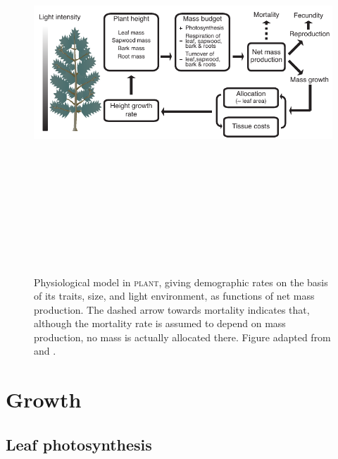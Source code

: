 \documentclass[10pt,twoside]{article}
\newcommand{\plant}{\textsc{plant}}
\begin{document}
\begin{figure}[h!]
\centering
\includegraphics[width=15cm,height=15cm,keepaspectratio]{../figures/schematic-phys}
\caption{Physiological model in {\plant}, giving
demographic rates on the basis of its traits, size, and light environment, as functions of
net mass production. The dashed arrow towards mortality indicates that, although the mortality rate is assumed to depend on mass production, no
mass is actually allocated there. Figure adapted from
\citet{Falster-2011} and \citet{Falster-2015}.}
\label{fig:schematic-phys}
\end{figure}

\section{Growth}\label{growth}

\subsection{Leaf photosynthesis}\label{leaf-photosynthesis}
\end{document}
